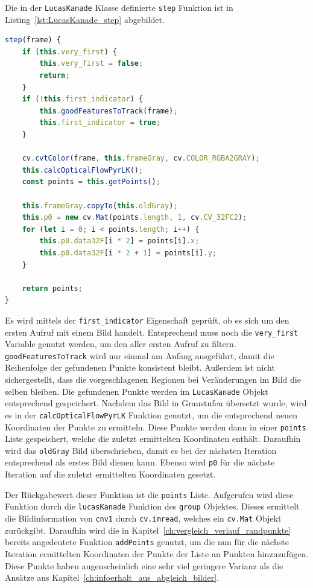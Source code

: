 Die in der \lstinline{LucasKanade} Klasse definierte \lstinline{step} Funktion ist in Listing~\ref{lst:LucasKanade_step} abgebildet.

\begin{lstlisting}[language=JavaScript, caption={Implementation der \lstinline{step} Funktion der \lstinline{LucasKanade} Klasse}, label={lst:LucasKanade_step}]
step(frame) {
    if (this.very_first) {
        this.very_first = false;
        return;
    }
    if (!this.first_indicator) {
        this.goodFeaturesToTrack(frame);
        this.first_indicator = true;
    }

    cv.cvtColor(frame, this.frameGray, cv.COLOR_RGBA2GRAY);
    this.calcOpticalFlowPyrLK();
    const points = this.getPoints();

    this.frameGray.copyTo(this.oldGray);
    this.p0 = new cv.Mat(points.length, 1, cv.CV_32FC2);
    for (let i = 0; i < points.length; i++) {
        this.p0.data32F[i * 2] = points[i].x;
        this.p0.data32F[i * 2 + 1] = points[i].y;
    }

    return points;
}
\end{lstlisting}

Es wird mittels der \lstinline{first_indicator} Eigenschaft geprüft, ob es sich um den ersten Aufruf mit einem Bild handelt.
Entsprechend muss noch die \lstinline{very_first} Variable genutzt werden, um den aller ersten Aufruf zu filtern.
\lstinline{goodFeaturesToTrack} wird nur einmal am Anfang ausgeführt, damit die Reihenfolge der gefundenen Punkte konsistent bleibt.
Au{\ss}erdem ist nicht sichergestellt, dass die vorgeschlagenen Regionen bei Veränderungen im Bild die selben bleiben.
Die gefundenen Punkte werden im \lstinline{LucasKanade} Objekt entsprechend gespeichert.
Nachdem das Bild in Graustufen übersetzt wurde, wird es in der \lstinline{calcOpticalFlowPyrLK} Funktion genutzt, um die entsprechend neuen Koordinaten der Punkte zu ermitteln.
Diese Punkte werden dann in einer \lstinline{points} Liste gespeichert, welche die zuletzt ermittelten Koordinaten enthält.
Daraufhin wird das \lstinline{oldGray} Bild überschrieben, damit es bei der nächsten Iteration entsprechend als erstes Bild dienen kann.
Ebenso wird \lstinline{p0} für die nächste Iteration auf die zuletzt ermittelten Koordinaten gesetzt.

Der Rückgabewert dieser Funktion ist die \lstinline{points} Liste.
Aufgerufen wird diese Funktion durch die \lstinline{lucasKanade} Funktion des \lstinline{group} Objektes.
Dieses ermittelt die Bildinformation von \lstinline{cnv1} durch \lstinline{cv.imread}, welches ein \lstinline{cv.Mat} Objekt zurückgibt.
Daraufhin wird die in Kapitel~\ref{ch:vergleich_verlauf_randpunkte} bereits angedeutete Funktion \lstinline{addPoints} genutzt, um die nun für die nächste Iteration ermittelten Koordinaten der Punkte der Liste an Punkten hinzuzufügen.
Diese Punkte haben augenscheinlich eine sehr viel geringere Varianz als die Ansätze aus Kapitel~\ref{ch:infoerhalt_aus_abgleich_bilder}.

